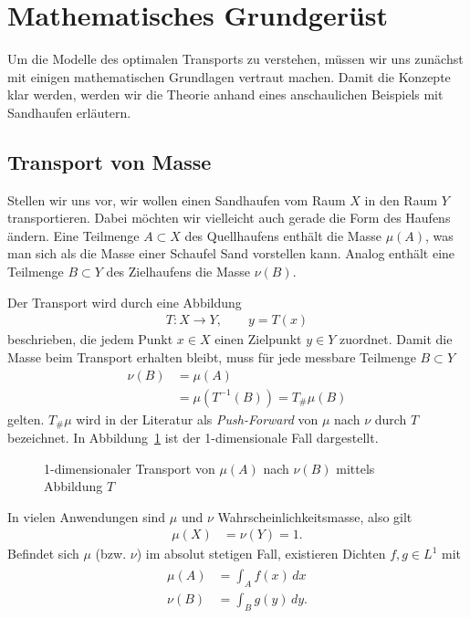 %
%
%
%
\section{Mathematisches Grundgerüst\label{mongekant:section:teil0}}

Um die Modelle des optimalen Transports zu verstehen,
müssen wir uns zunächst mit einigen mathematischen Grundlagen vertraut machen.
Damit die Konzepte klar werden,
werden wir die Theorie anhand eines anschaulichen Beispiels mit Sandhaufen erläutern.

\subsection{Transport von Masse\label{mongekant:subection:transport}}
Stellen wir uns vor,
wir wollen einen Sandhaufen vom Raum $X$
in den Raum $Y$ transportieren.
Dabei möchten wir vielleicht auch gerade die Form des Haufens ändern.
Eine Teilmenge $A\subset X$ des Quellhaufens enthält die Masse $\mu(A)$,
was man sich als die Masse einer Schaufel Sand vorstellen kann.
Analog enthält eine Teilmenge $B\subset Y$ des Zielhaufens die Masse $\nu(B)$.

Der Transport wird durch eine Abbildung
\begin{align*}
T\colon X\to Y
,\qquad y=T(x)
\end{align*}
beschrieben,
die jedem Punkt $x\in X$ einen Zielpunkt $y\in Y$ zuordnet.
Damit die Masse beim Transport erhalten bleibt,
muss für jede messbare Teilmenge $B\subset Y$
\begin{align*}
\nu(B)
&=
\mu(A)
\\
&=
\mu\left(T^{-1}(B)\right)
=
T_{\#}\mu(B)
\end{align*}
gelten.
$T_{\#}\mu$ wird in der Literatur als \emph{Push-Forward} von $\mu$ nach $\nu$ durch $T$ bezeichnet.
In Abbildung~\ref{mongekant:fig:optimal_transport} ist der 1-dimensionale Fall dargestellt.

\begin{figure}
\centering

\caption{1-dimensionaler Transport von $\mu(A)$ nach $\nu(B)$ mittels Abbildung $T$}
\label{mongekant:fig:optimal_transport}
\end{figure}

In vielen Anwendungen sind $\mu$ und $\nu$ Wahrscheinlichkeitsmasse,
also gilt
\begin{align*}
\mu(X)
&=
\nu(Y)
=
1
.
\end{align*}
Befindet sich $\mu$ (bzw. $\nu$) im absolut stetigen Fall,
existieren Dichten $f,g\in L^{1}$ mit
\begin{align}
\begin{aligned}
\mu(A)
&=
\int_A f(x) \, dx
\\
\nu(B)
&=
\int_B g(y) \, dy
.
\end{aligned}
\label{mongekant:eq:absolute_continuity}
\end{align}

